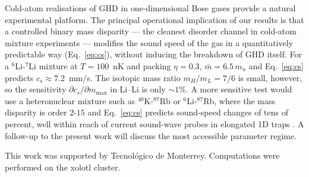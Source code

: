 \documentclass[aps,pre,twocolumn,superscriptaddress,longbibliography,floatfix]{revtex4-2}
\begin{document}
Cold-atom realisations of GHD in one-dimensional Bose gases
\cite{Schemmer2019,Malvania2021,Cataldini2022} provide a
natural experimental platform. The principal operational
implication of our results is that a controlled binary mass
disparity --- the cleanest disorder channel in cold-atom
mixture experiments --- modifies the sound speed of the gas in
a quantitatively predictable way (Eq.~\ref{eq:cs}), without
inducing the breakdown of GHD itself. For a $^{6}$Li-$^{7}$Li mixture at $T=100$~nK and packing
$\eta = 0.3$, $\bar m = 6.5\,m_u$ and Eq.~\eqref{eq:cs}
predicts $c_s\approx 7.2$~mm/s. The isotopic mass ratio
$m_H/m_L = 7/6$ is small, however, so the sensitivity
$\partial c_s/\partial m_{\max}$ in Li--Li is only $\sim 1\%$.
A more sensitive test would use a heteronuclear mixture such
as $^{40}$K-$^{87}$Rb or $^{6}$Li-$^{87}$Rb, where the mass
disparity is order $2$-$15$ and Eq.~\eqref{eq:cs} predicts
sound-speed changes of tens of percent, well within reach of
current sound-wave probes in elongated 1D traps
\cite{Cataldini2022}. A follow-up to the present work will
discuss the most accessible parameter regime.

\begin{acknowledgments}
This work was supported by Tecnol\'ogico de Monterrey.
Computations were performed on the xolotl cluster.
\end{acknowledgments}
\end{document}
